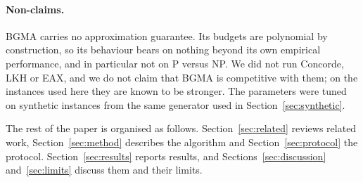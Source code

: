\paragraph{Non-claims.}
BGMA carries no approximation guarantee. Its budgets are polynomial by construction, so its behaviour
bears on nothing beyond its own empirical performance, and in particular not on P versus NP. We did
not run Concorde, LKH or EAX, and we do not claim that BGMA is competitive with them; on the instances
used here they are known to be stronger. The parameters were tuned on synthetic instances from the
same generator used in Section~\ref{sec:synthetic}.

The rest of the paper is organised as follows. Section~\ref{sec:related} reviews related work,
Section~\ref{sec:method} describes the algorithm and Section~\ref{sec:protocol} the protocol.
Section~\ref{sec:results} reports results, and Sections~\ref{sec:discussion} and~\ref{sec:limits}
discuss them and their limits.
